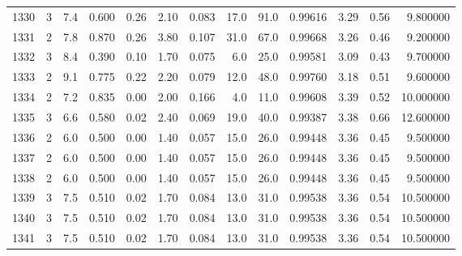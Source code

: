 \begin{tabular}{lrrrrrrrrrrrr}
1330 &        3 &            7.4 &             0.600 &         0.26 &            2.10 &      0.083 &                 17.0 &                  91.0 &  0.99616 &  3.29 &       0.56 &   9.800000 \\
1331 &        2 &            7.8 &             0.870 &         0.26 &            3.80 &      0.107 &                 31.0 &                  67.0 &  0.99668 &  3.26 &       0.46 &   9.200000 \\
1332 &        3 &            8.4 &             0.390 &         0.10 &            1.70 &      0.075 &                  6.0 &                  25.0 &  0.99581 &  3.09 &       0.43 &   9.700000 \\
1333 &        2 &            9.1 &             0.775 &         0.22 &            2.20 &      0.079 &                 12.0 &                  48.0 &  0.99760 &  3.18 &       0.51 &   9.600000 \\
1334 &        2 &            7.2 &             0.835 &         0.00 &            2.00 &      0.166 &                  4.0 &                  11.0 &  0.99608 &  3.39 &       0.52 &  10.000000 \\
1335 &        3 &            6.6 &             0.580 &         0.02 &            2.40 &      0.069 &                 19.0 &                  40.0 &  0.99387 &  3.38 &       0.66 &  12.600000 \\
1336 &        2 &            6.0 &             0.500 &         0.00 &            1.40 &      0.057 &                 15.0 &                  26.0 &  0.99448 &  3.36 &       0.45 &   9.500000 \\
1337 &        2 &            6.0 &             0.500 &         0.00 &            1.40 &      0.057 &                 15.0 &                  26.0 &  0.99448 &  3.36 &       0.45 &   9.500000 \\
1338 &        2 &            6.0 &             0.500 &         0.00 &            1.40 &      0.057 &                 15.0 &                  26.0 &  0.99448 &  3.36 &       0.45 &   9.500000 \\
1339 &        3 &            7.5 &             0.510 &         0.02 &            1.70 &      0.084 &                 13.0 &                  31.0 &  0.99538 &  3.36 &       0.54 &  10.500000 \\
1340 &        3 &            7.5 &             0.510 &         0.02 &            1.70 &      0.084 &                 13.0 &                  31.0 &  0.99538 &  3.36 &       0.54 &  10.500000 \\
1341 &        3 &            7.5 &             0.510 &         0.02 &            1.70 &      0.084 &                 13.0 &                  31.0 &  0.99538 &  3.36 &       0.54 &  10.500000 \\

\end{tabular}
